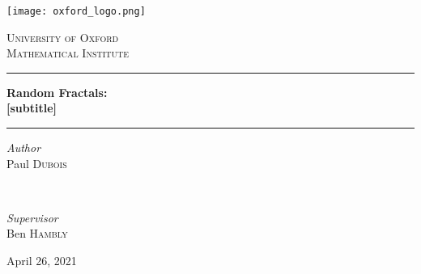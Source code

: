 \begin{titlepage}
	\newcommand{\HRule}{\rule{\linewidth}{0.5mm}}
		\begin{center}
		\texttt{[image: oxford\_logo.png]}
		\vspace*{1cm}
		
		\textsc{\LARGE University of Oxford}\\[0.75cm]
		\textsc{\LARGE Mathematical Institute}
		
		\vspace{1.5cm}
		
		\HRule

		\vspace{0.5cm}

		\textbf{\huge Random Fractals:\\}
		\vspace{0.3cm}
		\textbf{\huge [subtitle]}
		
		\vspace{0.5cm}
		\HRule
		
		\vspace{1.5cm}
		
		\begin{minipage}{0.4\textwidth}
			\begin{flushleft}
				\large
				\textit{Author}\\
				Paul \textsc{Dubois}
			\end{flushleft}
		\end{minipage}
		~
		\begin{minipage}{0.4\textwidth}
			\begin{flushright}
				\large
				\textit{Supervisor}\\
				Ben \textsc{Hambly}
			\end{flushright}
		\end{minipage}
		
		\vfill
		
		{\large April 26, 2021}
	\end{center}
\end{titlepage}

